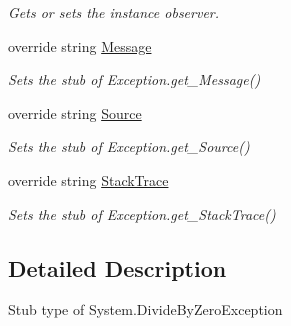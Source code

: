 \begin{DoxyCompactItemize}
\begin{DoxyCompactList}\small\item\em Gets or sets the instance observer.\end{DoxyCompactList}\item 
override string \hyperlink{class_system_1_1_fakes_1_1_stub_divide_by_zero_exception_af1a7beeb7990c34ca3740a9f0a28bab2}{Message}
\begin{DoxyCompactList}\small\item\em Sets the stub of Exception.\-get\-\_\-\-Message()\end{DoxyCompactList}\item 
override string \hyperlink{class_system_1_1_fakes_1_1_stub_divide_by_zero_exception_acf140598d6951ccd6384a33f2036eb25}{Source}
\begin{DoxyCompactList}\small\item\em Sets the stub of Exception.\-get\-\_\-\-Source()\end{DoxyCompactList}\item 
override string \hyperlink{class_system_1_1_fakes_1_1_stub_divide_by_zero_exception_a2a864aa4b642a143f0a7982f3814c31f}{Stack\-Trace}
\begin{DoxyCompactList}\small\item\em Sets the stub of Exception.\-get\-\_\-\-Stack\-Trace()\end{DoxyCompactList}\end{DoxyCompactItemize}


\subsection{Detailed Description}
Stub type of System.\-Divide\-By\-Zero\-Exception



